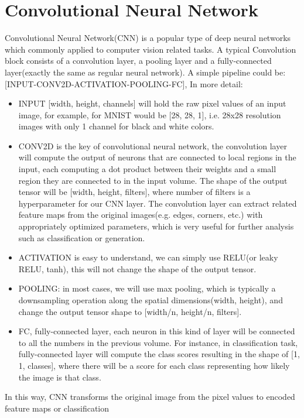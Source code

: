 \section{Convolutional Neural Network}
\nocite{cs231n}
Convolutional Neural Network(CNN) is a popular type of deep neural networks which commonly applied to computer
vision related tasks. A typical Convolution block consists of a convolution layer, a pooling layer and a 
fully-connected layer(exactly the same as regular neural network). A simple pipeline could be:
[INPUT-CONV2D-ACTIVATION-POOLING-FC], In more detail:
\begin{itemize}
    \item INPUT [width, height, channels] will hold the raw pixel values of an input image, for example, for MNIST
    would be [28, 28, 1], i.e. 28x28 resolution images with only 1 channel for black and white colors.
    \item CONV2D is the key of convolutional neural network, the convolution
    layer will compute the output of neurons that are connected to local regions in the input, each 
    computing a dot product between their weights and a small region they are connected to in the input volume.
    The shape of the output tensor will be [width, height, filters], where number of filters is a hyperparameter for our 
    CNN layer. The convolution layer can extract related feature maps from the original images(e.g. edges, corners, etc.)
    with appropriately optimized parameters, which is very useful for further analysis such as classification or 
    generation. 
    \item ACTIVATION is easy to understand, we can simply use RELU(or leaky RELU, tanh), this will not change the 
    shape of the output tensor.
    \item POOLING: in most cases, we will use max pooling, which is typically a downsampling operation along the 
    spatial dimensions(width, height), and change the output tensor shape to [width/n, height/n, filters].
    \item FC, fully-connected layer, each neuron in this kind of layer will be connected to 
    all the numbers in the previous volume.
    For instance, in classification task, fully-connected layer will compute the class scores 
    resulting in the shape of [1, 1, classes], where there will be a score for each class representing 
    how likely the image is that class.
\end{itemize}
In this way, CNN transforms the original image from the pixel values to encoded feature maps or classification 
